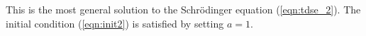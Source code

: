 This is the most general solution to 
the Schr\"odinger equation (\ref{eqn:tdse_2}). The initial condition
(\ref{eqn:init2}) is satisfied by setting $a=1$.


\vspace{2cm}


%
%
%
%
%
%
%
%
%
